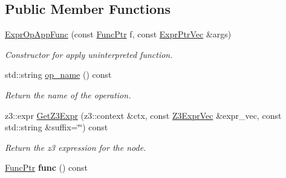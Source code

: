 \subsection*{Public Member Functions}
\begin{DoxyCompactItemize}
\item 
\mbox{\label{classilang_1_1_expr_op_app_func_a7e7ee49b0286c23b23e9657a9f0121e5}} 
\mbox{\hyperlink{classilang_1_1_expr_op_app_func_a7e7ee49b0286c23b23e9657a9f0121e5}{Expr\+Op\+App\+Func}} (const \mbox{\hyperlink{classilang_1_1_expr_op_app_func_a979ae4696cdcab50159f2a99a410a612}{Func\+Ptr}} f, const \mbox{\hyperlink{classilang_1_1_expr_a17efc8282f647681d37cd4c78928aa01}{Expr\+Ptr\+Vec}} \&args)
\begin{DoxyCompactList}\small\item\em Constructor for apply uninterpreted function. \end{DoxyCompactList}\item 
\mbox{\label{classilang_1_1_expr_op_app_func_a8bce09f93c53370435da869297d406ca}} 
std\+::string \mbox{\hyperlink{classilang_1_1_expr_op_app_func_a8bce09f93c53370435da869297d406ca}{op\+\_\+name}} () const
\begin{DoxyCompactList}\small\item\em Return the name of the operation. \end{DoxyCompactList}\item 
\mbox{\label{classilang_1_1_expr_op_app_func_a32137f39887907d70c7cafb282b1b4df}} 
z3\+::expr \mbox{\hyperlink{classilang_1_1_expr_op_app_func_a32137f39887907d70c7cafb282b1b4df}{Get\+Z3\+Expr}} (z3\+::context \&ctx, const \mbox{\hyperlink{namespaceilang_adc4eee919aa24fff882d03a48d733c19}{Z3\+Expr\+Vec}} \&expr\+\_\+vec, const std\+::string \&suffix=\char`\"{}\char`\"{}) const
\begin{DoxyCompactList}\small\item\em Return the z3 expression for the node. \end{DoxyCompactList}\item 
\mbox{\label{classilang_1_1_expr_op_app_func_a5d6e3cd6b63a4a35a5caf5c94eaa8928}} 
\mbox{\hyperlink{classilang_1_1_expr_op_app_func_a979ae4696cdcab50159f2a99a410a612}{Func\+Ptr}} {\bfseries func} () const
\end{DoxyCompactItemize}
